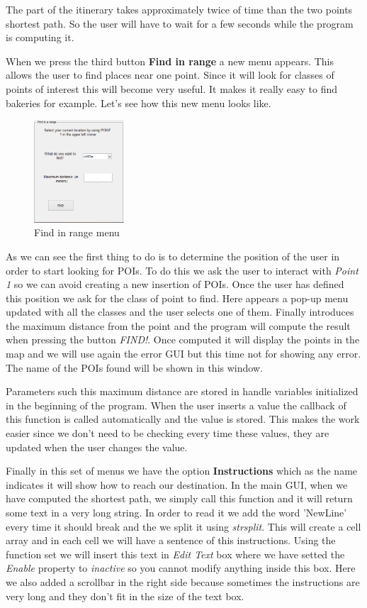 \documentclass{article}
\begin{document}
The part of the itinerary takes approximately twice of time than the two points shortest path. So the user will have to wait for a few seconds while the program is computing it.

When we press the third button \textbf{Find in range} a new menu appears. This allows the user to find places near one point. Since it will look for classes of points of interest this will become very useful. It makes it really easy to find bakeries for example. Let's see how this new menu looks like.

\begin{figure}[h]
\centering
\includegraphics[width=0.3\textwidth]{find_range}
\caption{Find in range menu}
\label{fig:find_range}
\end{figure}

As we can see the first thing to do is to determine the position of the user in order to start looking for POIs. To do this we ask the user to interact with \textit{Point 1} so we can avoid creating a new insertion of POIs. Once the user has defined this position we ask for the class of point to find. Here appears a pop-up menu updated with all the classes and the user selects one of them. Finally introduces the maximum distance from the point and the program will compute the result when pressing the button \textit{FIND!}. Once computed it will display the points in the map and we will use again the error GUI but this time not for showing any error. The name of the POIs found will be shown in this window. 

Parameters such this maximum distance are stored in handle variables initialized in the beginning of the program. When the user inserts a value the callback of this function is called automatically and the value is stored. This makes the work easier since we don't need to be checking every time these values, they are updated when the user changes the value.
 
Finally in this set of menus we have the option \textbf{Instructions} which as the name indicates it will show how to reach our destination. In the main GUI, when we have computed the shortest path, we simply call this function and it will return some text in a very long string. In order to read it we add the word 'NewLine' every time it should break and the we split it using \textit{strsplit}. This will create a cell array and in each cell we will have a sentence of this instructions. Using the function set we will insert this text in \textit{Edit Text} box where we have setted the \textit{Enable} property to \textit{inactive} so you cannot modify anything inside this box. Here we also added a scrollbar in the right side because sometimes the instructions are very long and they don't fit in the size of the text box.
\end{document}
